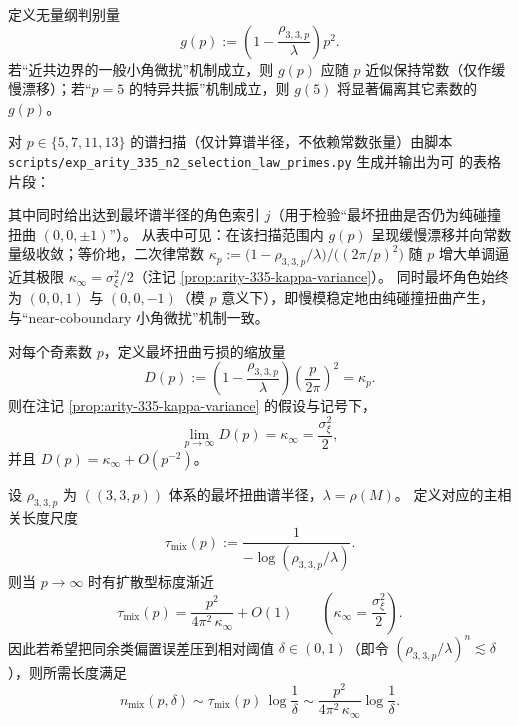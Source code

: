 

\begin{remark}\label{rem:arity-335-selection-law-gp}
定义无量纲判别量
$$
g(p):=\left(1-\frac{\rho_{3,3,p}}{\lambda}\right)p^2.
$$
若“近共边界的一般小角微扰”机制成立，则 \(g(p)\) 应随 \(p\) 近似保持常数（仅作缓慢漂移）；若“\(p=5\) 的特异共振”机制成立，则 \(g(5)\) 将显著偏离其它素数的 \(g(p)\)。

对 \(p\in\{5,7,11,13\}\) 的谱扫描（仅计算谱半径，不依赖常数张量）由脚本
\texttt{scripts/exp\_arity\_335\_n2\_selection\_law\_primes.py}
生成并输出为可 \verb|| 的表格片段：

其中同时给出达到最坏谱半径的角色索引 \(j\)（用于检验“最坏扭曲是否仍为纯碰撞扭曲 \((0,0,\pm1)\)”）。
从表中可见：在该扫描范围内 \(g(p)\) 呈现缓慢漂移并向常数量级收敛；等价地，二次律常数 \(\kappa_p:=\bigl(1-\rho_{3,3,p}/\lambda\bigr)/\bigl((2\pi/p)^2\bigr)\) 随 \(p\) 增大单调逼近其极限 \(\kappa_\infty=\sigma_\xi^2/2\)（注记 \ref{prop:arity-335-kappa-variance}）。
同时最坏角色始终为 \((0,0,1)\) 与 \((0,0,-1)\)（模 \(p\) 意义下），即慢模稳定地由纯碰撞扭曲产生，与“near-coboundary 小角微扰”机制一致。
\end{remark}

\begin{remark}\label{thm:arity-335-limit-law}
对每个奇素数 \(p\)，定义最坏扭曲亏损的缩放量
$$
D(p)
:=
\left(1-\frac{\rho_{3,3,p}}{\lambda}\right)\left(\frac{p}{2\pi}\right)^2
=\kappa_p.
$$
则在注记 \ref{prop:arity-335-kappa-variance} 的假设与记号下，
$$
\lim_{p\to\infty}D(p)=\kappa_\infty=\frac{\sigma_\xi^2}{2},
$$
并且 \(D(p)=\kappa_\infty+O(p^{-2})\)。
\end{remark}

\begin{remark}\label{cor:arity-335-diffusive-mixing}
设 $\rho_{3,3,p}$ 为 $((3,3,p))$ 体系的最坏扭曲谱半径，$\lambda=\rho(M)$。
定义对应的主相关长度尺度
\[
\tau_{\mathrm{mix}}(p):=\frac{1}{-\log(\rho_{3,3,p}/\lambda)}.
\]
则当 $p\to\infty$ 时有扩散型标度渐近
\[
\tau_{\mathrm{mix}}(p)=\frac{p^2}{4\pi^2\,\kappa_\infty}+O(1)
\qquad\left(\kappa_\infty=\frac{\sigma_\xi^2}{2}\right).
\]
因此若希望把同余类偏置误差压到相对阈值 $\delta\in(0,1)$（即令 $(\rho_{3,3,p}/\lambda)^n\lesssim \delta$），则所需长度满足
\[
n_{\mathrm{mix}}(p,\delta)
\sim
\tau_{\mathrm{mix}}(p)\,\log\frac{1}{\delta}
\sim
\frac{p^2}{4\pi^2\,\kappa_\infty}\log\frac{1}{\delta}.
\]
\end{remark}

